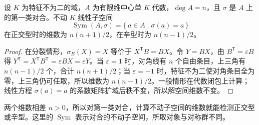 \begin{proposition}\label{b2:prop:B-involution-type-dimension}
	设 \(K\) 为特征不为二的域，\(A\) 为有限维中心单 \(K\) 代数，\(\deg A=n\)，且 \(\sigma\) 是 \(A\) 上的第一类对合。不动 \(K\) 线性子空间
	\[
		\operatorname{Sym}(A,\sigma)=\bigl\{\,a\in A\mid\sigma(a)=a\,\bigr\}
	\]
	在正交型时的维数为 \(n(n+1)/2\)，在辛型时为 \(n(n-1)/2\)。
\end{proposition}
\begin{proof}
	在分裂情形，\(\sigma_B(X)=X\) 等价于 \(X^{\mathsf T}B=BX\)。令 \(Y=BX\)，由 \(B^{\mathsf T}=\varepsilon B\) 得 \(Y^{\mathsf T}=X^{\mathsf T}B^{\mathsf T}=\varepsilon BX=\varepsilon Y\)。当 \(\varepsilon=1\) 时，对角线有 \(n\) 个自由条目，上三角有 \(n(n-1)/2\) 个，合计 \(n(n+1)/2\)；当 \(\varepsilon=-1\) 时，特征不为二使对角条目全为零，上三角仍可任取，所以维数为 \(n(n-1)/2\)。一般情形在代数闭包上计算；线性方程 \(\sigma(a)=a\) 的系数矩阵扩域后秩不变，所以解空间维数不变。
\end{proof}

两个维数相差 \(n>0\)，所以对第一类对合，计算不动子空间的维数就能检测正交型或辛型。这里的 \(\operatorname{Sym}\) 表示对合的不动子空间，所取对象与对称群不同。

